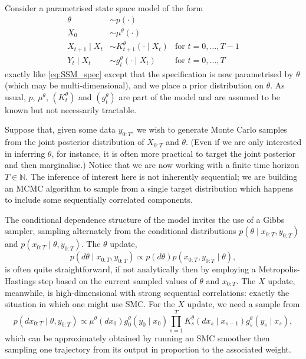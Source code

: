 Consider a parametrised state space model of the form
\begin{align*}
\theta &\sim p(\cdot) & \\
X_0 &\sim \mu^\theta(\cdot) & \\
X_{t+1} \mid X_{t} &\sim K_{t+1}^\theta(\cdot \mid X_{t}) &\text{for } t=0,\dots, T-1 \\
Y_t \mid X_t &\sim g_t^\theta(\cdot \mid X_t) &\text{for } t=0,\dots, T
\end{align*}
exactly like \eqref{eq:SSM_spec} except that the specification is now parametrised by $\theta$ (which may be multi-dimensional), and we place a prior distribution on $\theta$. 
As usual, $p$, $\mu^\theta$, $(K_t^\theta)$ and $(g_t^\theta)$ are part of the model and are assumed to be known but not necessarily tractable.

Suppose that, given some data $y_{0:T}$, we wish to generate Monte Carlo samples from the joint posterior distribution of $X_{0:T}$ and $\theta$. (Even if we are only interested in inferring $\theta$, for instance, it is often more practical to target the joint posterior and then marginalise.)
Notice that we are now working with a finite time horizon $T\in\mathbb{N}$. The inference of interest here is not inherently sequential; we are building an MCMC algorithm to sample from a single target distribution which happens to include some sequentially correlated components.


The conditional dependence structure of the model invites the use of a Gibbs sampler, sampling alternately from the conditional distributions $p(\theta \mid x_{0:T}, y_{0:T})$ and $p(x_{0:T} \mid \theta, y_{0:T})$.
The $\theta$ update,
\begin{equation*}
p(d\theta \mid x_{0:T}, y_{0:T}) \propto p(d\theta) p(x_{0:T}, y_{0:T} \mid \theta) ,
\end{equation*}
is often quite straightforward, if not analytically then by employing a Metropolis-Hastings step based on the current sampled values of $\theta$ and $x_{0:T}$. 
The $X$ update, meanwhile, is high-dimensional with strong sequential correlations: exactly the situation in which one might use SMC. 
For the $X$ update, we need a sample from
\begin{equation}\label{eq:PG_Xposterior}
p(dx_{0:T} \mid \theta, y_{0:T}) 
\propto \mu^\theta(dx_0) g_0^\theta(y_0\mid x_0) \prod_{s=1}^T K_s^\theta(dx_s \mid x_{s-1}) g_s^\theta(y_s \mid x_s) ,
\end{equation}
which can be approximately obtained by running an SMC smoother then sampling one trajectory from its output in proportion to the associated weight.

